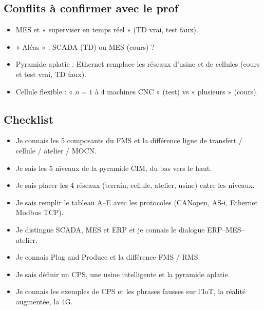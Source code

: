 \documentclass[11pt,a4paper]{article}
\begin{document}
\subsection*{Conflits à confirmer avec le prof}
\begin{itemize}
\item MES et « superviser en temps réel » (TD vrai, test faux).
\item « Aléas » : SCADA (TD) ou MES (cours) ?
\item Pyramide aplatie : Ethernet remplace les réseaux d'usine et de cellules (cours et test vrai, TD faux).
\item Cellule flexible : « $n=1$ à $4$ machines CNC » (test) vs « plusieurs » (cours).
\end{itemize}

\subsection*{Checklist}
\begin{itemize}[label=$\square$]
\item Je connais les 5 composants du FMS et la différence ligne de transfert / cellule / atelier / MOCN.
\item Je sais les 5 niveaux de la pyramide CIM, du bas vers le haut.
\item Je sais placer les 4 réseaux (terrain, cellule, atelier, usine) entre les niveaux.
\item Je sais remplir le tableau A--E avec les protocoles (CANopen, AS-i, Ethernet Modbus TCP).
\item Je distingue SCADA, MES et ERP et je connais le dialogue ERP--MES--atelier.
\item Je connais Plug and Produce et la différence FMS / RMS.
\item Je sais définir un CPS, une usine intelligente et la pyramide aplatie.
\item Je connais les exemples de CPS et les phrases fausses sur l'IoT, la réalité augmentée, la 4G.
\end{itemize}
\end{document}
